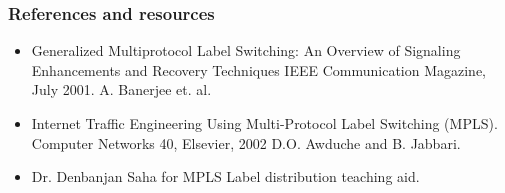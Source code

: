 \documentclass[12pt]{beamer}
\begin{document}
\begin{frame}
  \frametitle{References and resources}
  \begin{itemize}
    \item Generalized Multiprotocol Label Switching: An Overview of Signaling Enhancements and Recovery Techniques
          IEEE Communication Magazine, July 2001.
          A. Banerjee et. al. 
    \item Internet Traffic Engineering Using Multi-Protocol Label Switching (MPLS).
          Computer Networks 40, Elsevier, 2002
          D.O. Awduche and B. Jabbari. 
    \item Dr. Denbanjan Saha for MPLS Label distribution teaching aid.
  \end{itemize}
\end{frame}
\end{document}
